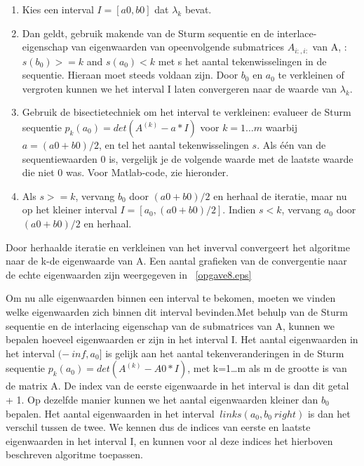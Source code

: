 \documentclass[]{article}
\begin{document}
\begin{enumerate}
 \item Kies een interval $I=[a0,b0]$ dat $\lambda_k$ bevat.
 \item Dan geldt, gebruik makende van de Sturm sequentie en de interlace- eigenschap van eigenwaarden van opeenvolgende submatrices $A_{i:,i:}$ van A, : $s(b_0) >= k$ and $s(a_0) < k$ met s het aantal tekenwisselingen in de sequentie. Hieraan moet steeds voldaan zijn. Door $b_0$ en $a_0$ te verkleinen of vergroten kunnen we het interval I laten convergeren naar de waarde van $\lambda_k$.
 \item Gebruik de bisectietechniek om het interval te verkleinen: evalueer de Sturm sequentie $p_k(a_0) = det(A^{(k)} - a*I)$ voor $k=1\dots m$ waarbij $a=(a0+b0)/2$, en tel het aantal tekenwisselingen $s$. Als \'{e}\'{e}n van de sequentiewaarden 0 is, vergelijk je de volgende waarde met de laatste waarde die niet 0 was. Voor Matlab-code, zie hieronder.
 \item Als $s >= k$, vervang $b_0$ door $(a0+b0)/2$ en herhaal de iteratie, maar nu op het kleiner interval $I=[a_0,(a0+b0)/2]$.
 Indien $s < k$, vervang $a_0$ door $(a0+b0)/2$ en herhaal.
 \end{enumerate}
 Door herhaalde iteratie en verkleinen van het inverval convergeert het algoritme naar de k-de eigenwaarde van A. Een aantal grafieken van de convergentie naar de echte eigenwaarden zijn weergegeven in ~\ref{opgave8.eps}
 
 Om nu alle eigenwaarden binnen een interval te bekomen, moeten we vinden welke eigenwaarden zich binnen dit interval bevinden.Met behulp van de Sturm sequentie en de interlacing eigenschap van de submatrices van A, kunnen we bepalen hoeveel eigenwaarden er zijn in het interval I. Het aantal eigenwaarden in het interval $ (- \ inf, a_0]$ is gelijk aan het aantal tekenveranderingen in de Sturm sequentie $ p_k (a_0) = det (A ^ {(k)} - A0 * I) $, met k=1\dots m als m de grootte is van de matrix A. De index van de eerste eigenwaarde in het interval is dan dit getal + 1. Op dezelfde manier kunnen we het aantal eigenwaarden kleiner dan $ b_0 $ bepalen. Het aantal eigenwaarden in het interval $ \ links (a_0, b_0 \ right) $ is dan het verschil tussen de twee. We kennen dus de indices van eerste en laatste eigenwaarden in het interval I, en kunnen voor al deze indices het hierboven beschreven algoritme toepassen.
\end{document}
